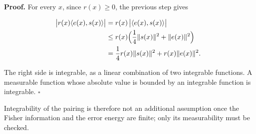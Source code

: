 \documentclass[11pt,a4paper]{report}
\begin{document}
\textbf{Proof.} For every \(x\), since \(r(x)\ge0\), the previous step gives


\[\begin{aligned}\bigl|r(x)\langle e(x),s(x)\rangle\bigr|&=r(x)\,\bigl|\langle e(x),s(x)\rangle\bigr|\\&\le r(x)\Bigl(\frac14\|s(x)\|^2+\|e(x)\|^2\Bigr)\\&=\frac14r(x)\|s(x)\|^2+r(x)\|e(x)\|^2.\end{aligned}\]


The right side is integrable, as a linear combination of two integrable functions. A measurable function whose absolute value is bounded by an integrable function is integrable. \(\square\)




Integrability of the pairing is therefore not an additional assumption once the Fisher information and the error energy are finite; only its measurability must be checked.
\end{document}
